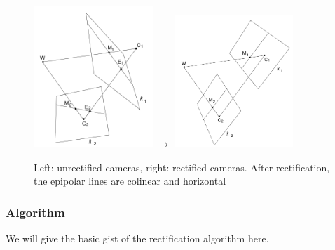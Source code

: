 \documentclass[a4paper]{article}
\begin{document}
\begin{figure}[h!]
\centering
\includegraphics[width=0.4\textwidth]{nonrectepipole}
$\rightarrow$
\includegraphics[width=0.4\textwidth]{rectepipole}
\caption{Left: unrectified cameras, right: rectified cameras. After
rectification, the epipolar lines are colinear and horizontal}
\label{fig:rectepipole} \end{figure}

\subsubsection{Algorithm}
We will give the basic gist of the rectification algorithm here. 
\end{document}
